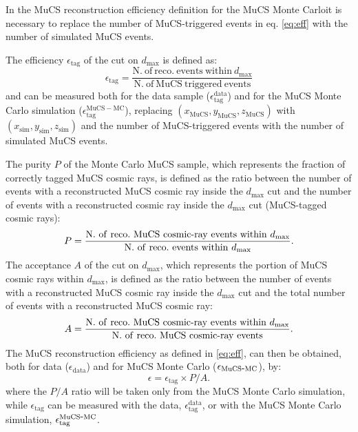 \documentclass[a4paper,11pt]{article}
\def\myhyphen{{\hbox{-}}}
\begin{document}
In the MuCS reconstruction efficiency definition for the MuCS Monte Carloit is necessary to replace the number of MuCS-triggered events in eq. \eqref{eq:eff} with the number of simulated MuCS events.

The efficiency $\epsilon_{\mathrm{tag}}$ of the cut on $d_{\mathrm{max}}$ is defined as:
\begin{equation}
  \epsilon_{\mathrm{tag}}=\frac{\mathrm{N.~of~reco.~events~within~}d_{\mathrm{max}}}{\mathrm{N.~of~MuCS~triggered~events}}
\end{equation}
and can be measured both for the data sample ($\epsilon^{\mathrm{data}}_{\mathrm{tag}}$) and for the MuCS Monte Carlo simulation ($\epsilon^{\mathrm{MuCS-MC}}_{\mathrm{tag}}$), replacing $(x_{\mathrm{MuCS}},y_{\mathrm{MuCS}},z_{\mathrm{MuCS}})$ with $(x_{\mathrm{sim}},y_{\mathrm{sim}},z_{\mathrm{sim}})$ and the number of MuCS-triggered events with the number of simulated MuCS events.

The purity $P$ of the Monte Carlo MuCS sample, which represents the fraction of correctly tagged MuCS cosmic rays, is defined as the ratio between the number of events with a reconstructed MuCS cosmic ray inside the $d_{\mathrm{max}}$ cut and the number of events with a reconstructed cosmic ray inside the $d_{\mathrm{max}}$ cut (MuCS-tagged cosmic rays):
\begin{equation}
  P=\frac{\mathrm{N.~of~reco.~MuCS~cosmic\myhyphen ray~events~within~}d_{\mathrm{max}}}{\mathrm{N.~of~reco.~events~within~}d_{\mathrm{max}}}.
\end{equation}
The acceptance $A$ of the cut on $d_{\mathrm{max}}$, which represents the portion of MuCS cosmic rays within $d_{\mathrm{max}}$, is defined as the ratio between the number of events with a reconstructed MuCS cosmic ray inside the $d_{\mathrm{max}}$ cut and the total number of events with a reconstructed MuCS cosmic ray:
\begin{equation}
  A=\frac{\mathrm{N.~of~reco.~MuCS~cosmic\myhyphen ray~events~within~}d_{\mathrm{max}}}{\mathrm{N.~of~reco.~MuCS~cosmic\myhyphen ray~events}}.
\end{equation}
The MuCS reconstruction efficiency as defined in \eqref{eq:eff}, can then be obtained, both for data ($\epsilon_{\mathrm{data}}$) and for MuCS Monte Carlo ($\epsilon_{\mathrm{MuCS\myhyphen MC}}$), by:
\begin{equation}\label{eq:mceff}
  \epsilon = \epsilon_{\mathrm{tag}} \times P / A.
\end{equation}
where the $P/A$ ratio will be taken only from the MuCS Monte Carlo simulation, while $\epsilon_{\mathrm{tag}}$ can be measured with the data, $\epsilon^{\mathrm{data}}_{\mathrm{tag}}$, or with the MuCS Monte Carlo simulation, $\epsilon^{\mathrm{MuCS\myhyphen MC}}_{\mathrm{tag}}$.
\end{document}
